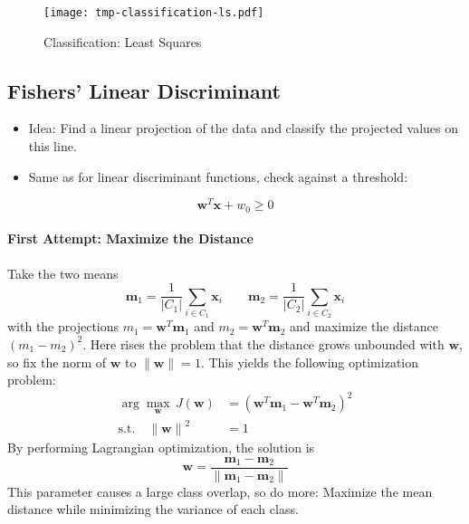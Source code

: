 \documentclass[a4paper, 11pt, accentcolor = tud3b]{tudreport}
\newcommand{\abs}[1]{\ensuremath{\lvert #1 \rvert}}
\newcommand{\norm}[1]{\ensuremath{\lVert #1 \rVert}}
\renewcommand{\vec}[1]{\mathbf{#1}}
\begin{document}
					\begin{figure}
						\centering
						\texttt{[image: tmp-classification-ls.pdf]}
						\caption{Classification: Least Squares}
						\label{fig:classificationLS}
					\end{figure}

			\subsection{Fishers' Linear Discriminant}
				\begin{itemize}
					\item Idea: Find a linear projection of the data and classify the projected values on this line.
					\item Same as for linear discriminant functions, check against a threshold:
				\end{itemize}
				\begin{equation}
					\vec{w}^T \vec{x} + w_0 \geq 0
				\end{equation}
				
				\paragraph{First Attempt: Maximize the Distance}
					Take the two means
					\begin{equation}
						\vec{m}_1 = \frac{1}{\abs{C_1}} \sum_{i \in C_1} \vec{x}_i \qquad \vec{m}_2 = \frac{1}{\abs{C_2}} \sum_{i \in C_2} \vec{x}_i
					\end{equation}
					with the projections \( m_1 = \vec{w}^T \vec{m}_1 \) and \( m_2 = \vec{w}^T \vec{m}_2 \) and maximize the distance \( (m_1 - m_2)^2 \). Here rises the problem that the distance grows unbounded with \(\vec{w}\), so fix the norm of \( \vec{w} \) to \( \norm{\vec{w}} = 1 \). This yields the following optimization problem:
					\begin{align}
						\arg\max\limits_{\vec{w}} \, J(\vec{w}) &= (\vec{w}^T \vec{m}_1 - \vec{w}^T \vec{m}_2)^2 \\
						\textrm{s.t.} \quad
						\norm{\vec{w}}^2 &= 1
					\end{align}
					By performing Lagrangian optimization, the solution is
					\begin{equation}
						\vec{w} = \frac{\vec{m}_1 - \vec{m}_2}{\norm{\vec{m}_1 - \vec{m}_2}}
					\end{equation}
					This parameter causes a large class overlap, so do more: Maximize the mean distance while minimizing the variance of each class.
				
\end{document}
